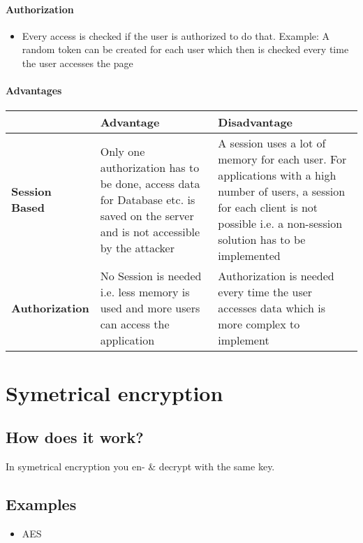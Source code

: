 \documentclass[11pt,twoside,a4paper]{article}
\begin{document}
\paragraph{Authorization}
\begin{itemize}
\item Every access is checked if the user is authorized to do that. Example: A random token can be created for each user which then is checked every time the user accesses the page
\end{itemize}

\paragraph{Advantages}

\begin{tabular}{|l|p{4cm}|p{4cm}|}
  \hline
  & \textbf{Advantage} & \textbf{Disadvantage} \\\hline
  \textbf{Session Based} & Only one authorization has to be done, access data for Database etc. is saved on the server and is not accessible by the attacker & A session uses a lot of memory for each user. For applications with a high number of users, a session for each client is not possible i.e. a non-session solution has to be implemented \\\hline
  \textbf{Authorization} & No Session is needed i.e. less memory is used and more users can access the application & Authorization is needed every time the user accesses data which is more complex to implement\\\hline
\end{tabular}

\section{Symetrical encryption}
\subsection{How does it work?}

In symetrical encryption you en- \& decrypt with the same key. 

\subsection{Examples}

\begin{itemize}
\item AES
\end{itemize}
\end{document}
